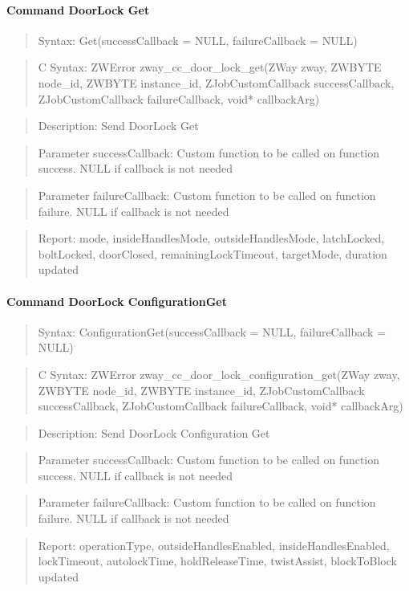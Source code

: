 \paragraph{Command DoorLock Get}
\begin{quote}Syntax: Get(successCallback = NULL, failureCallback = NULL)\end{quote}
\begin{quote}C Syntax: ZWError zway\_cc\_door\_lock\_get(ZWay zway, ZWBYTE node\_id, ZWBYTE instance\_id, ZJobCustomCallback successCallback, ZJobCustomCallback failureCallback, void* callbackArg)\end{quote}
\begin{quote}Description: Send DoorLock Get\end{quote}
\begin{quote}Parameter successCallback: Custom function to be called on function success. NULL if callback is not needed\end{quote}
\begin{quote}Parameter failureCallback: Custom function to be called on function failure. NULL if callback is not needed\end{quote}
\begin{quote}Report: mode, insideHandlesMode, outsideHandlesMode, latchLocked, boltLocked, doorClosed, remainingLockTimeout, targetMode, duration updated\end{quote}

\paragraph{Command DoorLock ConfigurationGet}
\begin{quote}Syntax: ConfigurationGet(successCallback = NULL, failureCallback = NULL)\end{quote}
\begin{quote}C Syntax: ZWError zway\_cc\_door\_lock\_configuration\_get(ZWay zway, ZWBYTE node\_id, ZWBYTE instance\_id, ZJobCustomCallback successCallback, ZJobCustomCallback failureCallback, void* callbackArg)\end{quote}
\begin{quote}Description: Send DoorLock Configuration Get\end{quote}
\begin{quote}Parameter successCallback: Custom function to be called on function success. NULL if callback is not needed\end{quote}
\begin{quote}Parameter failureCallback: Custom function to be called on function failure. NULL if callback is not needed\end{quote}
\begin{quote}Report: operationType, outsideHandlesEnabled, insideHandlesEnabled, lockTimeout, autolockTime, holdReleaseTime, twistAssist, blockToBlock updated\end{quote}

